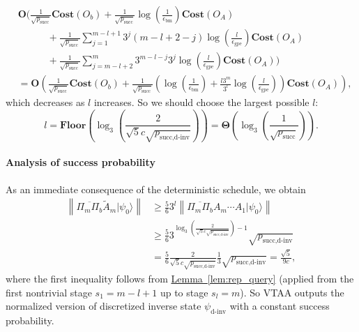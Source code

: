 \documentclass[letterpaper,onecolumn,11pt,accepted=2026-02-14]{quantumarticle}
\newcommand{\norm}[1]{\left\lVert#1\right\rVert}
\theoremstyle{remark}
\theoremstyle{plain}
\newcommand{\lem}[1]{\hyperref[lem:#1]{Lemma~\ref*{lem:#1}}}
\newcommand{\ket}[1]{|#1\rangle}
\begin{document}
\begin{equation}
\begin{aligned}
    &\mathbf{O}\Bigg(\frac{1}{\sqrt{p_{\text{succ}}}}\mathbf{Cost}\left(O_b\right)
    +\frac{1}{\sqrt{p_{\text{succ}}}}\log\left(\frac{1}{\epsilon_{\text{bm}}}\right)\mathbf{Cost}\left(O_A\right)\\
    &\qquad\quad+\frac{1}{\sqrt{p_{\text{succ}}}}\sum_{j=1}^{m-l+1}3^j(m-l+2-j)\log\left(\frac{l}{\epsilon_{\text{gpe}}}\right)\mathbf{Cost}(O_A)\\
    &\qquad\quad +\frac{1}{\sqrt{p_{\text{succ}}}}\sum_{j=m-l+2}^{m}3^{m-l-j}3^j\log\left(\frac{l}{\epsilon_{\text{gpe}}}\right)\mathbf{Cost}\left(O_A\right)\Bigg)\\
    &=\mathbf{O}\left(\frac{1}{\sqrt{p_{\text{succ}}}}\mathbf{Cost}\left(O_b\right)
    +\frac{1}{\sqrt{p_{\text{succ}}}}\left(\log\left(\frac{1}{\epsilon_{\text{bm}}}\right)+\frac{l3^m}{3^l}\log\left(\frac{l}{\epsilon_{\text{gpe}}}\right)\right)\mathbf{Cost}\left(O_A\right)\right),
\end{aligned}
\end{equation}
which decreases as $l$ increases. So we should choose the largest possible $l$:
\begin{equation}
    l=\mathbf{Floor}\left(\log_3\left(\frac{2}{\sqrt{5}c\sqrt{p_{\text{succ,d-inv}}}}\right)\right)
    =\mathbf{\Theta}\left(\log_3\left(\frac{1}{\sqrt{p_{\text{succ}}}}\right)\right).
\end{equation}

\paragraph{Analysis of success probability}
As an immediate consequence of the deterministic schedule, we obtain
\begin{equation}
\begin{aligned}
    \norm{\overline{\Pi_m\Pi_b}\widetilde A_m\ket{\psi_0}}
    &\geq\frac{5}{6}3^l\norm{\overline{\Pi_m\Pi_b}A_m\cdots A_1\ket{\psi_0}}\\
    &\geq\frac{5}{6}3^{\log_3\left(\frac{2}{\sqrt{5}c\sqrt{p_{\text{succ,d-inv}}}}\right)-1}\sqrt{p_{\text{succ,d-inv}}}\\
    &=\frac{5}{6}\frac{2}{\sqrt{5}c\sqrt{p_{\text{succ,d-inv}}}}\frac{1}{3}\sqrt{p_{\text{succ,d-inv}}}
    =\frac{\sqrt{5}}{9c},
\end{aligned}
\end{equation}
where the first inequality follows from \lem{rep_query} (applied from the first nontrivial stage $s_1=m-l+1$ up to stage $s_l=m$).
So VTAA outputs the normalized version of discretized inverse state $\psi_{\text{d-inv}}$ with a constant success probability.
\end{document}
